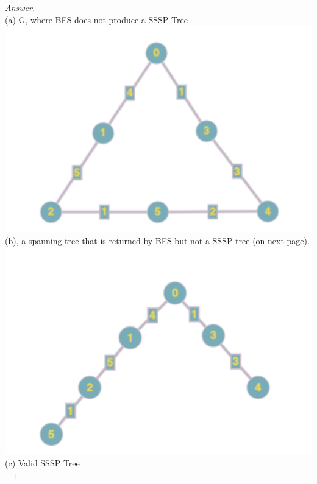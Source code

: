 \documentclass[11pt]{article}
\theoremstyle{definition}
\theoremstyle{definition}
\theoremstyle{definition}
\begin{document}
\begin{proof}[Answer] $ $\\
(a) G, where BFS does not produce a SSSP Tree \\
\includegraphics[]{image6.png} \\
(b), a spanning tree that is returned by BFS but not a SSSP tree (on next page).\\
\includegraphics[]{image7.png} \\
(c) Valid SSSP Tree \\

\end{proof}
\end{document}
